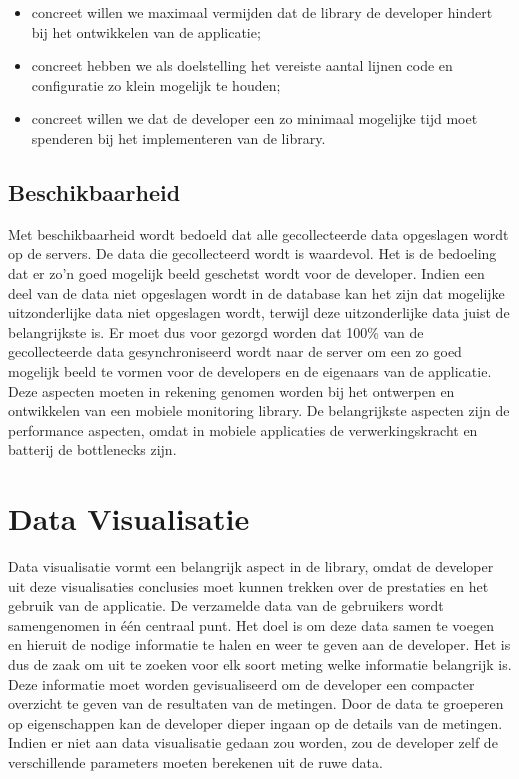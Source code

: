 \begin{itemize}
\item concreet willen we maximaal vermijden dat de library de developer hindert bij het ontwikkelen van de applicatie;

\item concreet hebben we als doelstelling het vereiste aantal lijnen code en configuratie zo klein mogelijk te houden;

\item concreet willen we dat de developer een zo minimaal mogelijke tijd moet spenderen bij het implementeren van de library.
\end{itemize}




\subsection{Beschikbaarheid}
Met beschikbaarheid wordt bedoeld dat alle gecollecteerde data opgeslagen wordt op de servers. De data die gecollecteerd wordt is waardevol. Het is de bedoeling dat er zo'n goed mogelijk beeld geschetst wordt voor de developer. Indien een deel van de data niet opgeslagen wordt in de database kan het zijn dat mogelijke uitzonderlijke data niet opgeslagen wordt, terwijl deze uitzonderlijke data juist de belangrijkste is. Er moet dus voor gezorgd worden dat 100\% van de gecollecteerde data gesynchroniseerd wordt naar de server om een zo goed mogelijk beeld te vormen voor de developers en de eigenaars van de applicatie.\\


Deze aspecten moeten in rekening genomen worden bij het ontwerpen en ontwikkelen van een mobiele monitoring library. De belangrijkste aspecten zijn de performance aspecten, omdat in mobiele applicaties de verwerkingskracht en batterij de bottlenecks zijn. 


\section{Data Visualisatie}
Data visualisatie vormt een belangrijk aspect in de library, omdat de developer uit deze visualisaties conclusies moet kunnen trekken over de prestaties en het gebruik van de applicatie. De verzamelde data van de gebruikers wordt samengenomen in \'e\'en centraal punt. Het doel is om deze data samen te voegen en hieruit de nodige informatie te halen en weer te geven aan de developer. Het is dus de zaak om uit te zoeken voor elk soort meting welke informatie belangrijk is. Deze informatie moet worden gevisualiseerd om de developer een compacter overzicht te geven van de resultaten van de metingen. Door de data te groeperen op eigenschappen kan de developer dieper ingaan op de details van de metingen. Indien er niet aan data visualisatie gedaan zou worden, zou de developer zelf de verschillende parameters moeten berekenen uit de ruwe data. \\

